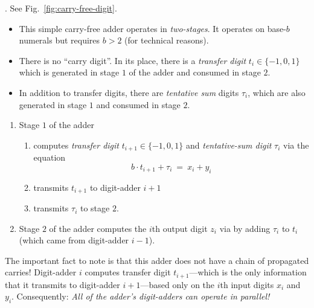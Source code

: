 . 
See Fig.~\ref{fig:carry-free-digit}.
\begin{itemize}
\item
This simple carry-free adder operates in {\em two-stages}.  It
operates on base-$b$ numerals but requires $b > 2$ (for technical
reasons).
\item
There is no ``carry digit''.  In its place, there is a {\it transfer
  digit} $t_i \in \{-1, 0, 1\}$ 
 which is generated in stage
$1$ of the adder and consumed in stage $2$.
\item
In addition to transfer digits, there are {\it tentative sum} digits
$\tau_i$,  
which are also generated in stage $1$ and consumed in stage $2$.
\end{itemize}
\begin{enumerate}
\item
Stage $1$ of the adder
\begin{enumerate}
\item
computes {\it transfer digit} $t_{i+1} \in \{-1, 0 , 1\}$ and {\it
  tentative-sum digit} $\tau_i$ via the equation
\[ b \cdot t_{i+1} + \tau_i \ = \ x_i + y_i \]
\item
transmits $t_{i+1}$ to digit-adder $i+1$
\item
transmits $\tau_i$ to stage $2$.
\end{enumerate}
\item
Stage $2$ of the adder computes the $i$th output digit $z_i$ via by
adding $\tau_i$ to $t_i$ (which came from digit-adder $i-1$).
\end{enumerate}
The important fact to note is that this adder does not have a chain of
propagated carries!  Digit-adder $i$ computes transfer digit
$t_{i+1}$---which is the only information that it transmits to
digit-adder $i+1$---based only on the $i$th input digits $x_i$ and
$y_i$.  Consequently: {\em All of the adder's digit-adders can operate
  in parallel!}
